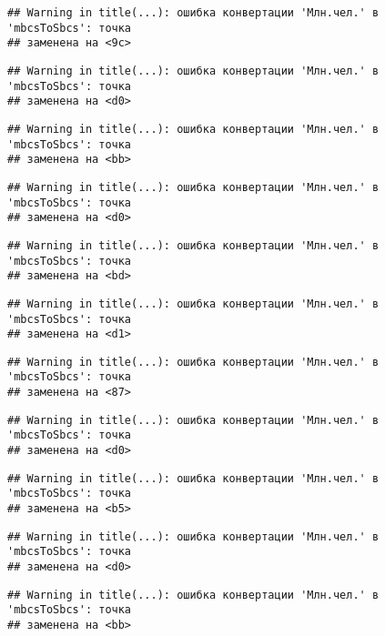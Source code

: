 \documentclass[
]{article}
\begin{document}
\begin{verbatim}
## Warning in title(...): ошибка конвертации 'Млн.чел.' в 'mbcsToSbcs': точка
## заменена на <9c>
\end{verbatim}

\begin{verbatim}
## Warning in title(...): ошибка конвертации 'Млн.чел.' в 'mbcsToSbcs': точка
## заменена на <d0>
\end{verbatim}

\begin{verbatim}
## Warning in title(...): ошибка конвертации 'Млн.чел.' в 'mbcsToSbcs': точка
## заменена на <bb>
\end{verbatim}

\begin{verbatim}
## Warning in title(...): ошибка конвертации 'Млн.чел.' в 'mbcsToSbcs': точка
## заменена на <d0>
\end{verbatim}

\begin{verbatim}
## Warning in title(...): ошибка конвертации 'Млн.чел.' в 'mbcsToSbcs': точка
## заменена на <bd>
\end{verbatim}

\begin{verbatim}
## Warning in title(...): ошибка конвертации 'Млн.чел.' в 'mbcsToSbcs': точка
## заменена на <d1>
\end{verbatim}

\begin{verbatim}
## Warning in title(...): ошибка конвертации 'Млн.чел.' в 'mbcsToSbcs': точка
## заменена на <87>
\end{verbatim}

\begin{verbatim}
## Warning in title(...): ошибка конвертации 'Млн.чел.' в 'mbcsToSbcs': точка
## заменена на <d0>
\end{verbatim}

\begin{verbatim}
## Warning in title(...): ошибка конвертации 'Млн.чел.' в 'mbcsToSbcs': точка
## заменена на <b5>
\end{verbatim}

\begin{verbatim}
## Warning in title(...): ошибка конвертации 'Млн.чел.' в 'mbcsToSbcs': точка
## заменена на <d0>
\end{verbatim}

\begin{verbatim}
## Warning in title(...): ошибка конвертации 'Млн.чел.' в 'mbcsToSbcs': точка
## заменена на <bb>
\end{verbatim}
\end{document}
